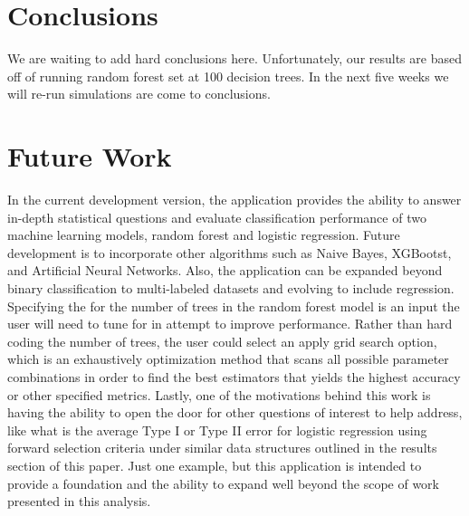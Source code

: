 \documentclass{llncs}
\begin{document}
\section{Conclusions}
\noindent 
We are waiting to add hard conclusions here.  Unfortunately, our results are based off of running random forest set at 100 decision trees.  In the next five weeks we will re-run simulations are come to conclusions.

\section{Future Work}
\noindent 

In the current development version, the application provides the ability to answer in-depth statistical questions and evaluate classification performance of two machine learning models, random forest and logistic regression. Future development is to incorporate other algorithms such as Naive Bayes, XGBootst, and Artificial Neural Networks. Also, the application can be expanded beyond binary classification to multi-labeled datasets and evolving to include regression. Specifying the for the number of trees in the random forest model is an input the user will need to tune for in attempt to improve performance. Rather than hard coding the number of trees, the user could select an apply grid search option, which is an exhaustively optimization method that scans all possible parameter combinations in order to find the best estimators that yields the highest accuracy or other specified metrics. Lastly, one of the motivations behind this work is having the ability to open the door for other questions of interest to help address, like what is the average Type I or Type II error for logistic regression using forward selection criteria under similar data structures outlined in the results section of this paper. Just one example, but this application is intended to provide a foundation and the ability to expand well beyond the scope of work presented in this analysis.
\end{document}
